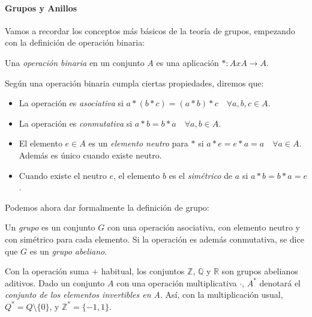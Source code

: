 

\paragraph{Grupos y Anillos}

\hfil

Vamos a recordar los conceptos más básicos de la teoría de grupos, empezando con la definición de operación binaria:

\begin{definition}
	Una \textit{operación binaria} en un conjunto $A$ es una aplicación $* : AxA \rightarrow A$.
\end{definition}

Según una operación binaria cumpla ciertas propiedades, diremos que:

\begin{itemize}
	\item La operación es \textit{asociativa} si $a*(b*c) = (a*b)*c \quad \forall a,b,c\in A$.
	\item La operación es \textit{conmutativa} si $a*b=b*a\quad \forall a,b\in A$.
	\item El elemento $e\in A$ es un \textit{elemento neutro} para $*$ si $a*e = e*a = a \quad \forall a\in A$. Además es único cuando existe neutro.
	\item Cuando existe el neutro $e$, el elemento $b$ es el \textit{simétrico} de $a$ si $a*b=b*a=e$.
\end{itemize}

Podemos ahora dar formalmente la definición de grupo:

\begin{definition}
	Un \textit{grupo} es un conjunto $G$ con una operación asociativa, con elemento neutro y con simétrico para cada elemento. Si la operación es además conmutativa, se dice que $G$ es un \textit{grupo abeliano}.
\end{definition}

Con la operación suma $+$ habitual, los conjuntos $\mathbb{Z}$, $\mathbb{Q}$ y $\mathbb{R}$ son grupos abelianos aditivos. Dado un conjunto $A$ con una operación multiplicativa $\cdot$, $A^*$ denotará el \textit{conjunto de los elementos invertibles en A}. Así, con la multiplicación usual, $Q^* = Q \setminus \{0\}$, y $\mathbb{Z}^* = \{-1,1\}$.

\hfil

